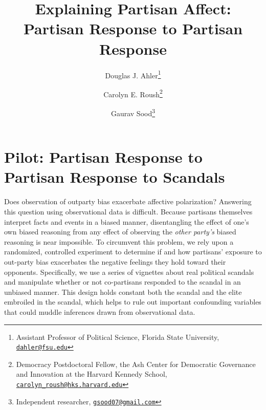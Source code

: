 \documentclass[12pt, letterpaper]{article}
\title{Explaining Partisan Affect: Partisan Response to Partisan Response}
\author{Douglas J. Ahler\thanks{Assistant Professor of Political Science, Florida State University, \href{mailto:dahler@fsu.edu}{\texttt{dahler@fsu.edu}}} \and Carolyn E. Roush\thanks{Democracy Postdoctoral Fellow, the Ash Center for Democratic Governance and Innovation at the Harvard Kennedy School, \href{mailto:carolyn_roush@hks.harvard.edu}{\texttt{carolyn\_roush@hks.harvard.edu}}} \and Gaurav Sood\thanks{Independent researcher, \href{gsood07@gmail.com}{\texttt{gsood07@gmail.com}}}}
\begin{document}
\maketitle
\thispagestyle{empty}

\begin{abstract}

\noindent 

\end{abstract}

\newpage
\doublespacing

\section*{Pilot: Partisan Response to Partisan Response to Scandals}

Does observation of outparty bias exacerbate affective polarization? Answering this question using observational data is difficult. Because partisans themselves interpret facts and events in a biased manner, disentangling the effect of one's own biased reasoning from any effect of observing the \textit{other party's} biased reasoning is near impossible. To circumvent this problem, we rely upon a randomized, controlled experiment to determine if and how partisans' exposure to out-party bias exacerbates the negative feelings they hold toward their opponents. Specifically, we use a series of vignettes about real political scandals and manipulate whether or not co-partisans responded to the scandal in an unbiased manner. This design holds constant both the scandal and the elite embroiled in the scandal, which helps to rule out important confounding variables that could muddle inferences drawn from observational data.
\end{document}
